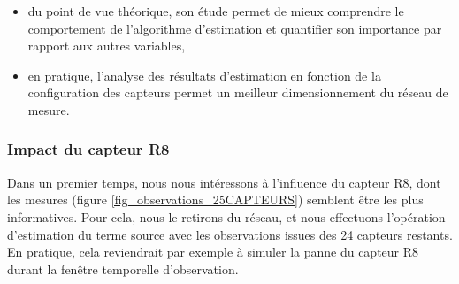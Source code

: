 \begin{itemize}
	\item du point de vue théorique, son étude permet de mieux comprendre le comportement de l'algorithme d'estimation et quantifier son importance par rapport aux autres variables,
	\item en pratique, l'analyse des résultats d'estimation en fonction de la configuration des capteurs permet un meilleur dimensionnement du réseau de mesure.\\
\end{itemize}

\subsubsection{Impact du capteur R8}

Dans un premier temps, nous nous intéressons à l'influence du capteur R8, dont les mesures (figure \ref{fig_observations_25CAPTEURS}) semblent être les plus informatives. Pour cela, nous le retirons du réseau, et nous effectuons l'opération d'estimation du terme source avec les observations issues des 24 capteurs restants. En pratique, cela reviendrait par exemple à simuler la panne du capteur R8 durant la fenêtre temporelle d'observation.\\



 
 
 




